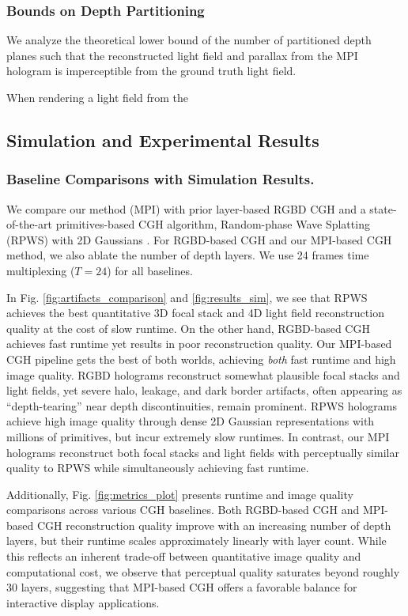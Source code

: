 \subsubsection{Bounds on Depth Partitioning}
We analyze the theoretical lower bound of the number of partitioned depth planes such that the reconstructed light field and parallax from the MPI hologram is imperceptible from the ground truth light field.


When rendering a light field from the 
\fi

\subsection{Simulation and Experimental Results}
\label{subsec:results}
\subsubsection{Baseline Comparisons with Simulation Results. } We compare our method (MPI) with prior layer-based RGBD CGH and a state-of-the-art primitives-based CGH algorithm, Random-phase Wave Splatting (RPWS) with 2D Gaussians \cite{chao2025rpws}. For RGBD-based CGH and our MPI-based CGH method, we also ablate the number of depth layers. We use 24 frames time multiplexing ($T=24$) for all baselines.

In Fig. \ref{fig:artifacts_comparison} and \ref{fig:results_sim}, we see that RPWS achieves the best quantitative 3D focal stack and 4D light field reconstruction quality at the cost of slow runtime. On the other hand, RGBD-based CGH achieves fast runtime yet results in poor reconstruction quality. Our MPI-based CGH pipeline gets the best of both worlds, achieving \textit{both} fast runtime and high image quality. RGBD holograms reconstruct somewhat plausible focal stacks and light fields, yet severe halo, leakage, and dark border artifacts, often appearing as “depth-tearing” near depth discontinuities, remain prominent. RPWS holograms achieve high image quality through dense 2D Gaussian representations with millions of primitives, but incur extremely slow runtimes. In contrast, our MPI holograms reconstruct both focal stacks and light fields with perceptually similar quality to RPWS while simultaneously achieving fast runtime.


Additionally, Fig. \ref{fig:metrics_plot} presents runtime and image quality comparisons across various CGH baselines. Both RGBD-based CGH and MPI-based CGH reconstruction quality improve with an increasing number of depth layers, but their runtime scales approximately linearly with layer count. While this reflects an inherent trade-off between quantitative image quality and computational cost, we observe that perceptual quality saturates beyond roughly 30 layers, suggesting that MPI-based CGH offers a favorable balance for interactive display applications.

